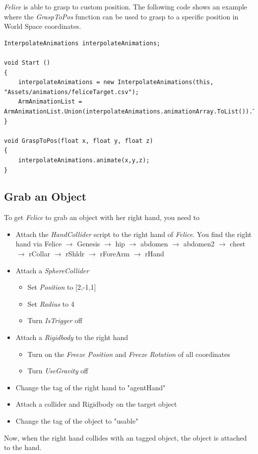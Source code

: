 \documentclass[10pt,final]{scrreprt}
\begin{document}
\emph{Felice} is able to grasp to custom position. The following code shows an example where the \emph{GraspToPos} function can be used to grasp to a specific position in World Space coordinates.

\begin{lstlisting}
InterpolateAnimations interpolateAnimations;

void Start () 
{			
	interpolateAnimations = new InterpolateAnimations(this, "Assets/animations/feliceTarget.csv");	
	ArmAnimationList = ArmAnimationList.Union(interpolateAnimations.animationArray.ToList()).ToList();			
}

void GraspToPos(float x, float y, float z)
{
	interpolateAnimations.animate(x,y,z);
}
\end{lstlisting}

\subsection{Grab an Object}
\label{grapobj}

To get \emph{Felice} to grab an object with her right hand, you need to 

\begin{itemize}
\item Attach the \emph{HandCollider} script to the right hand of \emph{Felice}. You find the right hand via
Felice \(\rightarrow\) Genesis \(\rightarrow\) hip \(\rightarrow\) abdomen \(\rightarrow\) abdomen2 \(\rightarrow\) chest \(\rightarrow\) rCollar \(\rightarrow\) rShldr \(\rightarrow\) rForeArm \(\rightarrow\) rHand 
\item Attach a \emph{SphereCollider}
\begin{itemize}
\item Set \emph{Position} to [2,-1,1]
\item Set \emph{Radius} to 4
\item Turn \emph{IsTrigger} off
\end{itemize}
\item Attach a \emph{Rigidbody} to the right hand
\begin{itemize}
\item Turn on the \emph{Freeze Position} and \emph{Freeze Rotation} of all coordinates
\item Turn \emph{UseGravity} off
\end{itemize}
\item Change the tag of the right hand to "agentHand"
\item Attach a collider and Rigidbody on the target object
\item Change the tag of the object to "usable"
\end{itemize}
Now, when the right hand collides with an tagged object, the object is attached to the hand.
\end{document}
